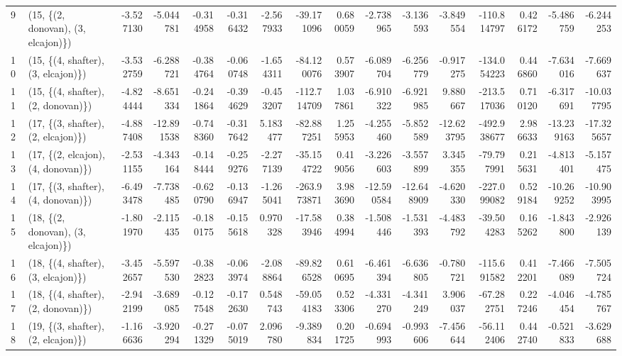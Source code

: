 \begin{tabular}{llrrrrrrrrrrrrrr}
9  &  (15, \{(2, donovan), (3, elcajon)\}) &  -3.527130 &  -5.044781 &  -0.314958 & -0.316432 &  -2.567933 &   -39.171096 &   0.680059 &  -2.738965 &  -3.136593 &  -3.849554 & -110.814797 &  0.426172 &  -5.486759 &  -6.244253 \\
10 &  (15, \{(4, shafter), (3, elcajon)\}) &  -3.532759 &  -6.288721 &  -0.384764 & -0.060748 &  -1.654311 &   -84.120076 &   0.573907 &  -6.089704 &  -6.256779 &  -0.917275 & -134.054223 &  0.446860 &  -7.634016 &  -7.669637 \\
11 &  (15, \{(4, shafter), (2, donovan)\}) &  -4.824444 &  -8.651334 &  -0.241864 & -0.394629 &  -0.453207 &  -112.714709 &   1.037861 &  -6.910322 &  -6.921985 &   9.880667 & -213.517036 &  0.710120 &  -6.317691 & -10.037795 \\
12 &  (17, \{(3, shafter), (2, elcajon)\}) &  -4.887408 & -12.891538 &  -0.748360 & -0.317642 &   5.183477 &   -82.887251 &   1.255953 &  -4.255460 &  -5.852589 & -12.623795 & -492.938677 &  2.986633 & -13.239163 & -17.325657 \\
13 &  (17, \{(2, elcajon), (4, donovan)\}) &  -2.531155 &  -4.343164 &  -0.148444 & -0.259276 &  -2.277139 &   -35.154722 &   0.419056 &  -3.226603 &  -3.557899 &   3.345355 &  -79.797991 &  0.215631 &  -4.813401 &  -5.157475 \\
14 &  (17, \{(3, shafter), (4, donovan)\}) &  -6.493478 &  -7.738485 &  -0.620790 & -0.136947 &  -1.265041 &  -263.973871 &   3.983690 & -12.590584 & -12.648909 &  -4.620330 & -227.099082 &  0.529184 & -10.269252 & -10.903995 \\
15 &  (18, \{(2, donovan), (3, elcajon)\}) &  -1.801970 &  -2.115435 &  -0.180175 & -0.155618 &   0.970328 &   -17.583946 &   0.384994 &  -1.508446 &  -1.531393 &  -4.483792 &  -39.504283 &  0.165262 &  -1.843800 &  -2.926139 \\
16 &  (18, \{(4, shafter), (3, elcajon)\}) &  -3.452657 &  -5.597530 &  -0.382823 & -0.063974 &  -2.088864 &   -89.826528 &   0.610695 &  -6.461394 &  -6.636805 &  -0.780721 & -115.691582 &  0.412201 &  -7.466089 &  -7.505724 \\
17 &  (18, \{(4, shafter), (2, donovan)\}) &  -2.942199 &  -3.689085 &  -0.127548 & -0.172630 &   0.548743 &   -59.054183 &   0.523306 &  -4.331270 &  -4.341249 &   3.906037 &  -67.282751 &  0.227246 &  -4.046454 &  -4.785767 \\
18 &  (19, \{(3, shafter), (2, elcajon)\}) &  -1.166636 &  -3.920294 &  -0.271329 & -0.075019 &   2.096780 &    -9.389834 &   0.201725 &  -0.694993 &  -0.993606 &  -7.456644 &  -56.112406 &  0.442740 &  -0.521833 &  -3.629688 \\

\end{tabular}
